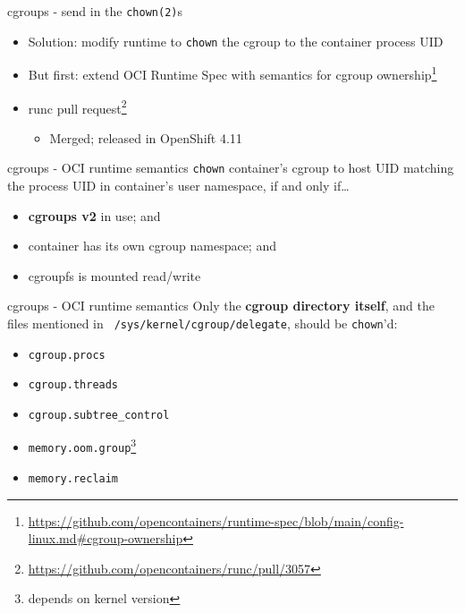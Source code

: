 \documentclass[ignorenonframetext,aspectratio=169,12pt]{beamer}
\begin{document}
\begin{frame}{cgroups - send in the \texttt{chown(2)}s}
\protect\hypertarget{openshift-cgroup-ownership}{}
\begin{itemize}

\item Solution: modify runtime to {\tt chown} the cgroup to the container
      process UID

\item But first: extend OCI Runtime Spec with semantics for
      cgroup ownership\footnote{\url{https://github.com/opencontainers/runtime-spec/blob/main/config-linux.md\#cgroup-ownership}}

\item runc pull request\footnote{\url{https://github.com/opencontainers/runc/pull/3057}}
  \begin{itemize}
  \item Merged; released in OpenShift 4.11
  \end{itemize}

\end{itemize}
\end{frame}

\begin{frame}{cgroups - OCI runtime semantics}
\protect\hypertarget{openshift-cgroup-ownership-semantics}{}
{\tt chown} container's cgroup to host UID matching the process UID in
container's user namespace, if and only if\ldots{}
\begin{itemize}
\item {\bf cgroups v2} in use; and
\item container has its own cgroup namespace; and
\item cgroupfs is mounted read/write
\end{itemize}
\end{frame}

\begin{frame}{cgroups - OCI runtime semantics}
\protect\hypertarget{openshift-cgroup-ownership-semantics-files}{}
Only the {\bf cgroup directory itself}, and the files mentioned in {\tt
/sys/kernel/cgroup/delegate}, should be {\tt chown}'d:

\begin{itemize}
\item {\tt cgroup.procs}
\item {\tt cgroup.threads}
\item {\tt cgroup.subtree\_control}
\item {\tt memory.oom.group}\footnote{depends on kernel version}
\item {\tt memory.reclaim}\footnotemark[\value{footnote}]
\end{itemize}

\end{frame}
\end{document}
